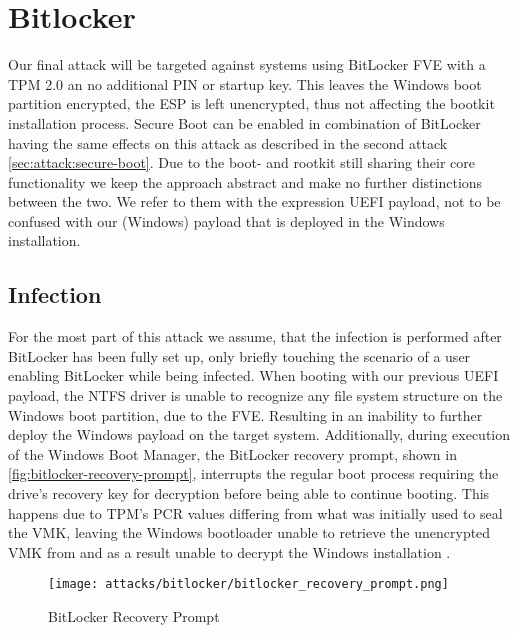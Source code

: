 \section{Bitlocker}

Our final attack will be targeted against systems using BitLocker \ac{FVE} with a \ac{TPM} 2.0 an no additional PIN or startup key.
This leaves the Windows boot partition encrypted, the \ac{ESP} is left unencrypted, thus not affecting the bootkit installation process.
Secure Boot can be enabled in combination of BitLocker having the same effects on this attack as described in the second attack \autoref{sec:attack:secure-boot}.
Due to the boot- and rootkit still sharing their core functionality we keep the approach abstract and make no further distinctions between the two.
We refer to them with the expression \ac{UEFI} payload, not to be confused with our (Windows) payload that is deployed in the Windows installation.

\subsection{Infection}

For the most part of this attack we assume, that the infection is performed after BitLocker has been fully set up, only briefly touching the scenario of a user enabling BitLocker while being infected.
When booting with our previous \ac{UEFI} payload, the \ac{NTFS} driver is unable to recognize any file system structure  on the Windows boot partition, due to the \ac{FVE}.
Resulting in an inability to further deploy the Windows payload on the target system.
Additionally, during execution of the Windows Boot Manager, the BitLocker recovery prompt, shown in \autoref{fig:bitlocker-recovery-prompt}, interrupts the regular boot process requiring the drive's recovery key for decryption before being able to continue booting.
This happens due to \ac{TPM}'s \ac{PCR} values differing from what was initially used to seal the \ac{VMK}, leaving the Windows bootloader unable to retrieve the unencrypted \ac{VMK} from and as a result unable to decrypt the Windows installation \cite[12.]{windows-internals-7-part2}.

\begin{figure}[htb]
    \centering
    \texttt{[image: attacks/bitlocker/bitlocker\_recovery\_prompt.png]}
    \caption{BitLocker Recovery Prompt}
    \label{fig:bitlocker-recovery-prompt}
\end{figure}

